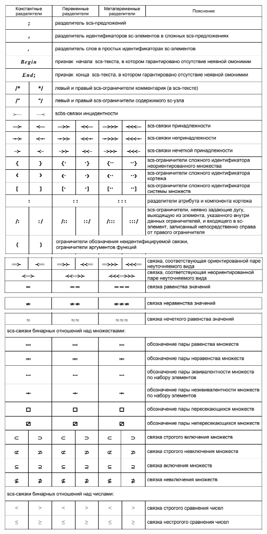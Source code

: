  \includegraphics[scale=0.48]{images/sc4.png}
 \includegraphics[scale=0.48]{images/sc5.png}
 \includegraphics[scale=0.48]{images/sc6.png}
 \includegraphics[scale=0.48]{images/sc7.png}
